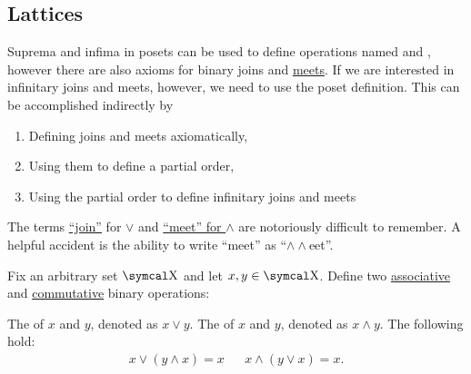 \subsection{Lattices}\label{subsec:lattices}

\begin{remark}\label{remark:infinite_lattice_operations}
  Suprema and infima in posets can be used to define operations named \hyperref[def:binary_lattice_operations/join]{} and \hyperref[def:binary_lattice_operations/meet]{}, however there are also axioms for binary joins and \hyperref[def:binary_lattice_operations]{meets}. If we are interested in infinitary joins and meets, however, we need to use the poset definition. This can be accomplished indirectly by
  \begin{enumerate}
    \item Defining joins and meets axiomatically,
    \item Using them to define a partial order,
    \item Using the partial order to define infinitary joins and meets
  \end{enumerate}
\end{remark}

\begin{remark}\label{remark:lattice_operation_etymology}
  The terms \hyperref[def:binary_lattice_operations/join]{\enquote{join}} for \( \vee \) and \hyperref[def:binary_lattice_operations/meet]{\enquote{meet} for \( \wedge \)} are notoriously difficult to remember. A helpful accident is the ability to write \enquote{meet} as \enquote{\( \wedge \wedge \)eet}.
\end{remark}

\begin{definition}\label{def:binary_lattice_operations}
  Fix an arbitrary set \( \CX \) and let \( x, y \in \CX \). Define two \hyperref[def:algebraic_theory/associativity]{associative} and \hyperref[def:algebraic_theory/commutativity]{commutative} binary operations:
  \begin{defenum}
     The  of \( x \) and \( y \), denoted as \( x \vee y \).
     The  of \( x \) and \( y \), denoted as \( x \wedge y \).
     The following  hold:
    \begin{align*}
      x \vee (y \wedge x) = x
      &&
      x \wedge (y \vee x) = x.
    \end{align*}
  \end{defenum}
\end{definition}

